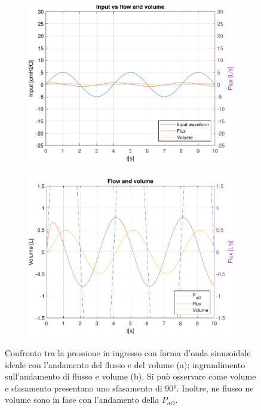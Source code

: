 \begin{figure}[t!]
\begin{subfigure}{0.5\linewidth}
	\centering
	\includegraphics[width=0.95\linewidth]{../model/data_log/data_sine_wave_freq_15.pdf}
	\caption{}
\end{subfigure}\hfill
\begin{subfigure}{0.5\linewidth}
	\centering
	\includegraphics[width=0.95\linewidth]{../model/data_log/data_sine_wave_freq_15_zoom.pdf}
	\caption{}
\end{subfigure}
\caption{Confronto tra la pressione in ingresso con forma d'onda sinusoidale ideale con l'andamento del flusso e del volume (a); ingrandimento sull'andamento di flusso e volume (b). Si può osservare come volume e sfasamento presentano uno sfasamento di 90°. Inoltre, ne flusso ne volume sono in fase con l'andamento della $P_{aO}$. }

\end{figure}
